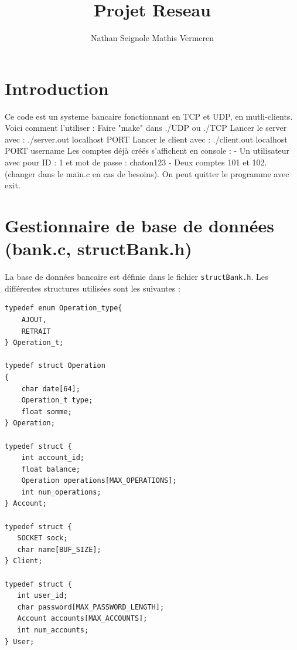 \documentclass{article}
\title{Projet Reseau}
\author{Nathan Seignole Mathis Vermeren}
\begin{document}
\maketitle

\section{Introduction}
Ce code est un systeme bancaire fonctionnant en TCP et UDP, en mutli-clients. Voici comment l'utiliser : 
Faire "make" dans ./UDP ou ./TCP
\newline
Lancer le server avec :
\newline
./server.out localhost PORT
\newline
\newline
Lancer le client avec : 
\newline
./client.out localhost PORT username
\newline
\newline
Les comptes déjà créés s'affichent en console : 
\newline
 - Un utilisateur avec pour ID : 1 et mot de passe : chaton123
\newline
 - Deux comptes 101 et 102.
\newline
(changer dans le main.c en cas de besoins).
\newline
On peut quitter le programme avec exit.

\section{Gestionnaire de base de données (bank.c, structBank.h)}

La base de données bancaire est définie dans le fichier \texttt{structBank.h}. Les différentes structures utilisées sont les suivantes :

\begin{verbatim}
typedef enum Operation_type{
    AJOUT,
    RETRAIT
} Operation_t;

typedef struct Operation
{
    char date[64];
    Operation_t type;
    float somme;
} Operation;

typedef struct {
    int account_id;
    float balance;
    Operation operations[MAX_OPERATIONS];
    int num_operations;
} Account;

typedef struct {
   SOCKET sock;
   char name[BUF_SIZE];
} Client;

typedef struct {
   int user_id;
   char password[MAX_PASSWORD_LENGTH];
   Account accounts[MAX_ACCOUNTS];
   int num_accounts;
} User;
\end{verbatim}
\end{document}
